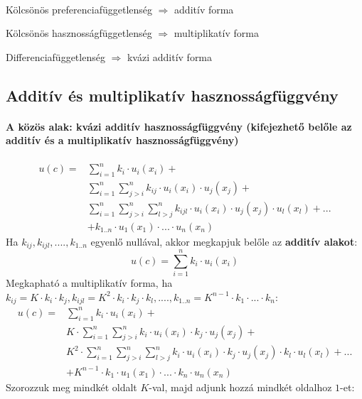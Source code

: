 \documentclass[a4paper,12pt]{article}
\begin{document}
\

Kölcsönös preferenciafüggetlenség $\Rightarrow$ additív forma

Kölcsönös hasznosságfüggetlenség  $\Rightarrow$ multiplikatív forma

Differenciafüggetlenség $\Rightarrow$ kvázi additív forma

\subsection{Additív és multiplikatív hasznosságfüggvény}
\paragraph{A közös alak: kvázi additív hasznosságfüggvény (kifejezhető belőle az additív és a multiplikatív hasznosságfüggvény)}
\begin{equation}
\begin{split}
u(c) = & \sum_{i=1}^n k_i\cdot u_i(x_i)+ \\
&\sum_{i=1}^n \sum_{j>i}^n k_{ij}\cdot u_i(x_i)\cdot u_j(x_j) + \\
&\sum_{i=1}^n \sum_{j>i}^n \sum_{l>j}^n k_{ijl}\cdot u_i(x_i)\cdot u_j(x_j)\cdot u_l(x_l) + ... \\ 
&+k_{1..n}\cdot u_1(x_1)\cdot  ... \cdot  u_n(x_n)
\end{split}
\end{equation}
Ha $k_{ij}, k_{ijl}, ...., k_{1..n}$ egyenlő nullával, akkor megkapjuk belőle az \textbf{additív alakot}:
\begin{equation}
u(c) =  \sum_{i=1}^n k_i\cdot u_i(x_i)
\end{equation}
Megkapható a multiplikatív forma, ha $k_{ij} = K\cdot k_i\cdot k_j, k_{ijl} = K^2\cdot k_i\cdot k_j\cdot k_l, ...., k_{1..n} = K^{n-1}\cdot k_1\cdot ...\cdot k_n$:
\begin{equation}
\label{multiq}
\begin{split}
u(c) = & \sum_{i=1}^n k_i\cdot u_i(x_i)+ \\
&K\cdot \sum_{i=1}^n \sum_{j>i}^n k_{i}\cdot u_i(x_i)\cdot k_{j}\cdot u_j(x_j) + \\
&K^2\cdot \sum_{i=1}^n \sum_{j>i}^n \sum_{l>j}^n k_{i}\cdot u_i(x_i)\cdot k_{j}\cdot u_j(x_j)\cdot k_{l}\cdot u_l(x_l) + ... \\ 
&+K^{n-1}\cdot k_{1}\cdot u_1(x_1)\cdot  ... \cdot  k_{n} \cdot  u_n(x_n)
\end{split}
\end{equation}
Szorozzuk meg mindkét oldalt $K$-val, majd adjunk hozzá mindkét oldalhoz $1$-et:
\end{document}
